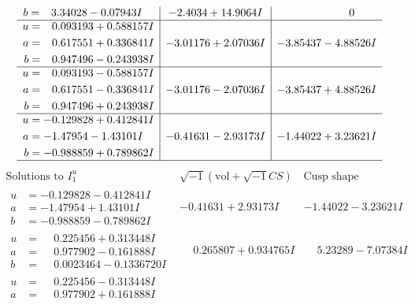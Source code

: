 \documentclass[1p]{elsarticle_modified}
\theoremstyle{definition}
\newcommand{\I}{\sqrt{-1}}
\begin{document}
$$\begin{array}{c|c|c}
\begin{aligned}
b &= \phantom{-}3.34028 - 0.07943 I\end{aligned}
 & -2.4034 + 14.9064 I & \phantom{-0.000000 } 0 \\ \hline\begin{aligned}
u &= \phantom{-}0.093193 + 0.588157 I \\
a &= \phantom{-}0.617551 + 0.336841 I \\
b &= \phantom{-}0.947496 - 0.243938 I\end{aligned}
 & -3.01176 + 2.07036 I & -3.85437 - 4.88526 I \\ \hline\begin{aligned}
u &= \phantom{-}0.093193 - 0.588157 I \\
a &= \phantom{-}0.617551 - 0.336841 I \\
b &= \phantom{-}0.947496 + 0.243938 I\end{aligned}
 & -3.01176 - 2.07036 I & -3.85437 + 4.88526 I \\ \hline\begin{aligned}
u &= -0.129828 + 0.412841 I \\
a &= -1.47954 - 1.43101 I \\
b &= -0.988859 + 0.789862 I\end{aligned}
 & -0.41631 - 2.93173 I & -1.44022 + 3.23621 I\\
 \hline 
 \end{array}$$\newpage$$\begin{array}{c|c|c}  
\text{Solutions to }I^u_{1}& \I (\text{vol} + \sqrt{-1}CS) & \text{Cusp shape}\\
 \hline 
\begin{aligned}
u &= -0.129828 - 0.412841 I \\
a &= -1.47954 + 1.43101 I \\
b &= -0.988859 - 0.789862 I\end{aligned}
 & -0.41631 + 2.93173 I & -1.44022 - 3.23621 I \\ \hline\begin{aligned}
u &= \phantom{-}0.225456 + 0.313448 I \\
a &= \phantom{-}0.977902 - 0.161888 I \\
b &= \phantom{-}0.0023464 - 0.1336720 I\end{aligned}
 & \phantom{-}0.265807 + 0.934765 I & \phantom{-}5.23289 - 7.07384 I \\ \hline\begin{aligned}
u &= \phantom{-}0.225456 - 0.313448 I \\
a &= \phantom{-}0.977902 + 0.161888 I \\

\end{aligned}
\end{array}$$
\end{document}
